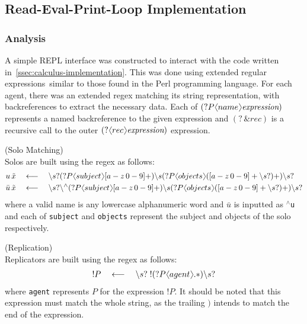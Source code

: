 \subsection{Read-Eval-Print-Loop Implementation}
    \subsubsection{Analysis}
        A simple REPL interface was constructed to interact with the code written in~\ref{ssec:calculus-implementation}.
        This was done using extended regular expressions\footnotemark~similar to those found in the Perl programming language.
        For each agent, there was an extended regex matching its string representation, with backreferences to extract the necessary data.
        Each of $(?P\langl name \rangl \textit{expression})$ represents a named backreference to the given expression and $(? \, \& rec)$ is a recursive call to the outer $(?\langl rec \rangl \textit{expression})$ expression.
        
        \begin{definition}{(Solo Matching)\\}
            Solos are built using the regex as follows:
            \begin{align*}
                u \, \tilde{x}       & \quad \longleftarrow \quad \backslash s? (?P \langl subject \rangl [a-z \, 0-9]+) \backslash s (?P \langl objects \rangl ([a-z \, 0-9]+ \backslash s?)+) \backslash s? \\
                \bar{u} \, \tilde{x} & \quad \longleftarrow \quad \backslash s? \backslash ^{\wedge} (?P \langl subject \rangl [a-z \, 0-9]+) \backslash s (?P \langl objects \rangl ([a-z \, 0-9]+ \backslash s?)+) \backslash s?
            \end{align*}
            where a valid name is any lowercase alphanumeric word and $\bar{u}$ is inputted as \texttt{$^{\wedge}$u} and each of \texttt{subject} and \texttt{objects} represent the subject and objects of the solo respectively.
        \end{definition}

        \begin{definition}{(Replication)\\}
            Replicators are built using the regex as follows:
            \begin{align*}
                ! P \quad \longleftarrow \quad \backslash s? \; !(?P \langl agent \rangl.*)\backslash s?
            \end{align*}
            where \texttt{agent} represents $P$ for the expression $!P$.
            It should be noted that this expression must match the whole string, as the trailing $)$ intends to match the end of the expression.
        \end{definition}

